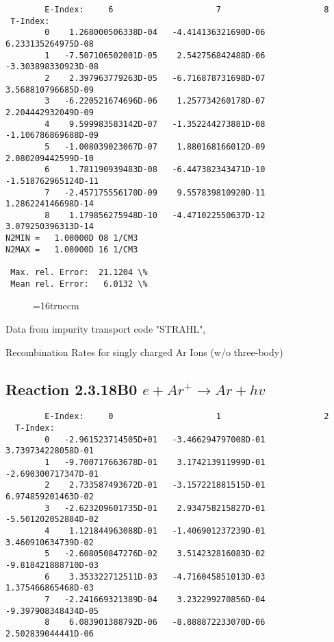 \documentclass[12pt,dvipdfmx]{article}
\begin{document}
{\begin{small}
\begin{verbatim}
        E-Index:     6                     7                     8
 T-Index:
        0    1.268000506338D-04   -4.414136321690D-06    6.233135264975D-08
        1   -7.507106502001D-05    2.542756842488D-06   -3.303898330923D-08
        2    2.397963779263D-05   -6.716878731698D-07    3.568810796685D-09
        3   -6.220521674696D-06    1.257734260178D-07    2.204442932049D-09
        4    9.599983583142D-07   -1.352244273881D-08   -1.106786869688D-09
        5   -1.008039023067D-07    1.880168166012D-09    2.080209442599D-10
        6    1.781190939483D-08   -6.447382343471D-10   -1.518762965124D-11
        7   -2.457175556170D-09    9.557839810920D-11    1.286224146698D-14
        8    1.179856275948D-10   -4.471022550637D-12    3.079250396313D-14
N2MIN =   1.00000D 08 1/CM3
N2MAX =   1.00000D 16 1/CM3

 Max. rel. Error:  21.1204 \%
 Mean rel. Error:   6.0132 \%

\end{verbatim}\end{small}
\begin{figure} \label{2.3.10B1}
\epsfxsize=16truecm
\end{figure}
\newpage
Data from impurity transport code "STRAHL", \cite{kn:Behringer}

  Recombination Rates for singly charged Ar Ions (w/o three-body)
\subsection{
Reaction 2.3.18B0  $  e + Ar^+ \rightarrow  Ar + hv $
}


\begin{small}\begin{verbatim}
        E-Index:     0                     1                     2
  T-Index:
        0   -2.961523714505D+01   -3.466294797008D-01    3.739734228058D-01
        1   -9.700717663678D-01    3.174213911999D-01   -2.690300717347D-01
        2    2.733587493672D-01   -3.157221881515D-01    6.974859201463D-02
        3   -2.623209601735D-01    2.934758215827D-01   -5.501202052884D-02
        4    1.121844963088D-01   -1.406901237239D-01    3.460910634739D-02
        5   -2.608050847276D-02    3.514232816083D-02   -9.818421888710D-03
        6    3.353322712511D-03   -4.716045851013D-03    1.375466865468D-03
        7   -2.241669321389D-04    3.232299270856D-04   -9.397908348434D-05
        8    6.083901388792D-06   -8.888872233070D-06    2.502839044441D-06


\end{verbatim}
\end{small}}
\end{document}
